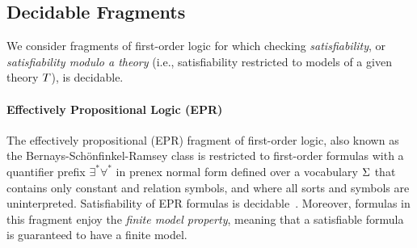 \subsection{Decidable Fragments}
\label{subsec:prelims:decidable-fragments}
We consider fragments of first-order logic for which checking \emph{satisfiability}, or \emph{satisfiability modulo a theory} (i.e., satisfiability restricted to models of a given theory $T$), is decidable.


\paragraph{Effectively Propositional Logic (EPR)}
\begin{sloppypar}
The effectively propositional (EPR) fragment of first-order logic,
also known as the Bernays-Sch\"onfinkel-Ramsey class is restricted to
first-order formulas with a quantifier prefix $\exists^{*} \forall^{*}$ in prenex
normal form defined over a vocabulary ${\Sigma}$ that contains only constant and relation
symbols, and where all sorts and symbols are uninterpreted. Satisfiability of EPR formulas is
decidable~\cite{LEWIS1980317}. Moreover, formulas in this fragment
enjoy the \emph{finite model property}, meaning that a satisfiable
formula is guaranteed to have a finite model.
\end{sloppypar}

